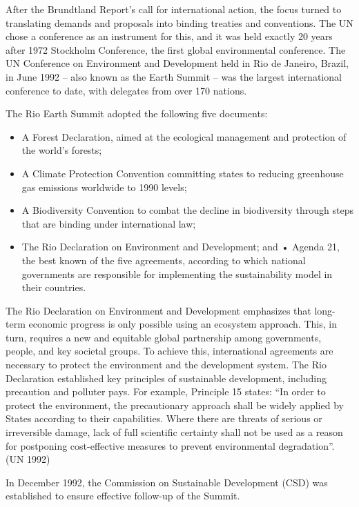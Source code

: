 \documentclass[
  a4paper,
  openany]{book}
\providecommand{\tightlist}{%
  \setlength{\itemsep}{0pt}\setlength{\parskip}{0pt}}
\begin{document}
After the Brundtland Report's call for international action, the focus
turned to translating demands and proposals into binding treaties and
conventions. The UN chose a conference as an instrument for this, and it
was held exactly 20 years after 1972 Stockholm Conference, the first
global environmental conference. The UN Conference on Environment and
Development held in Rio de Janeiro, Brazil, in June 1992 -- also known
as the Earth Summit -- was the largest international conference to date,
with delegates from over 170 nations.

The Rio Earth Summit adopted the following five documents:

\begin{itemize}
\tightlist
\item
  A Forest Declaration, aimed at the ecological management and
  protection of the world's forests;
\item
  A Climate Protection Convention committing states to reducing
  greenhouse gas emissions worldwide to 1990 levels;
\item
  A Biodiversity Convention to combat the decline in biodiversity
  through steps that are binding under international law;
\item
  The Rio Declaration on Environment and Development; and • Agenda 21,
  the best known of the five agreements, according to which national
  governments are responsible for implementing the sustainability model
  in their countries.
\end{itemize}

The Rio Declaration on Environment and Development emphasizes that
long-term economic progress is only possible using an ecosystem
approach. This, in turn, requires a new and equitable global partnership
among governments, people, and key societal groups. To achieve this,
international agreements are necessary to protect the environment and
the development system. The Rio Declaration established key principles
of sustainable development, including precaution and polluter pays. For
example, Principle 15 states: ``In order to protect the environment, the
precautionary approach shall be widely applied by States according to
their capabilities. Where there are threats of serious or irreversible
damage, lack of full scientific certainty shall not be used as a reason
for postponing cost-effective measures to prevent environmental
degradation''. (UN 1992)

In December 1992, the Commission on Sustainable Development (CSD) was
established to ensure effective follow-up of the Summit.
\end{document}
